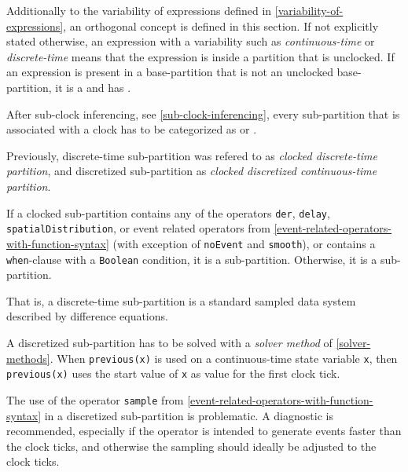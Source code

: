 Additionally to the variability of expressions defined in \cref{variability-of-expressions}, an orthogonal concept  is defined in this section.
If not explicitly stated otherwise, an expression with a variability such as \emph{continuous-time} or \emph{discrete-time} means that the expression is inside a partition that is unclocked.
If an expression is present in a base-partition that is not an unclocked base-partition, it is a  and has .

After sub-clock inferencing, see \cref{sub-clock-inferencing}, every sub-partition that is associated with a clock has to be categorized as  or .
\begin{nonnormative}
Previously, discrete-time sub-partition was refered to as \emph{clocked discrete-time partition}, and discretized sub-partition as \emph{clocked discretized continuous-time partition}.
\end{nonnormative}

If a clocked sub-partition contains any of the operators \lstinline!der!, \lstinline!delay!, \lstinline!spatialDistribution!, or event related operators from \cref{event-related-operators-with-function-syntax} (with exception of \lstinline!noEvent! and \lstinline!smooth!), or contains a \lstinline!when!-clause with a \lstinline!Boolean! condition, it is a  sub-partition.
Otherwise, it is a  sub-partition.

\begin{nonnormative}
That is, a discrete-time sub-partition is a standard sampled data system described by difference equations.
\end{nonnormative}

A discretized sub-partition has to be solved with a \emph{solver method} of \cref{solver-methods}.
When \lstinline!previous(x)! is used on a continuous-time state variable \lstinline!x!, then \lstinline!previous(x)! uses the start value of \lstinline!x! as value for the first clock tick.

The use of the operator \lstinline!sample! from \cref{event-related-operators-with-function-syntax} in a discretized sub-partition is problematic.
A diagnostic is recommended, especially if the operator is intended to generate events faster than the clock ticks, and otherwise the sampling should ideally be adjusted to the clock ticks.

